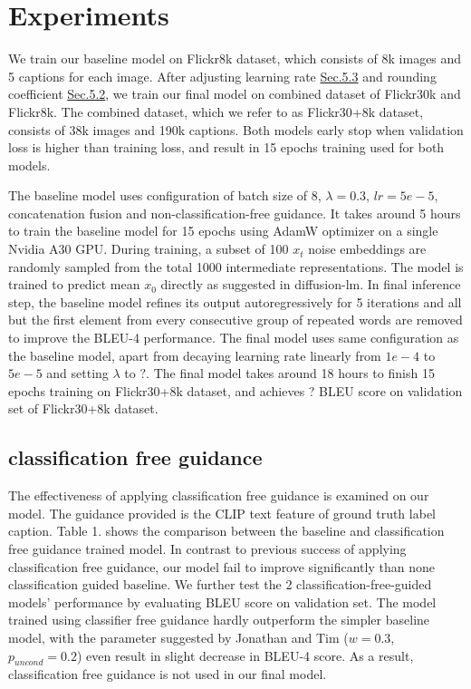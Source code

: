 \documentclass{article}
\begin{document}
\section{Experiments}
We train our baseline model on Flickr8k\cite{flickr8k} dataset, which consists of 8k images and 5 captions for each image. After adjusting learning rate \hyperref[sec:lr-exp]{Sec.5.3} and rounding coefficient \hyperref[sec:lambda-exp]{Sec.5.2}, we train our final model on combined dataset of Flickr30k\cite{flickr30k} and Flickr8k\cite{flickr8k}. The combined dataset, which we refer to as Flickr30+8k dataset, consists of 38k images and 190k captions. Both models early stop when validation loss is higher than training loss, and result in 15 epochs training used for both models.

The baseline model uses configuration of batch size of 8, $\lambda = 0.3$, $lr = 5e-5$, concatenation fusion and non-classification-free guidance. It takes around 5 hours to train the baseline model for 15 epochs using AdamW optimizer on a single Nvidia A30 GPU. During training, a subset of 100 $x_t$ noise embeddings are randomly sampled from the total 1000 intermediate representations. The model is trained to predict mean $x_0$ directly as suggested in diffusion-lm\cite{diffuselm}. In final inference step, the baseline model refines its output autoregressively for 5 iterations and all but the first element from every consecutive group of repeated words are removed to improve the BLEU-4 performance. The final model uses same configuration as the baseline model, apart from decaying learning rate linearly from $1e-4$ to $5e-5$ and setting $\lambda$ to $?$. The final model takes around 18 hours to finish 15 epochs training on Flickr30+8k dataset, and achieves ? BLEU score on validation set of Flickr30+8k dataset.

\subsection{classification free guidance}
\label{sec:classification-free-exp}
The effectiveness of applying classification free guidance is examined on our model. The guidance provided is the CLIP text feature of ground truth label caption. Table 1. shows the comparison between the baseline and classification free guidance trained model. In contrast to previous success of applying classification free guidance, our model fail to improve significantly than none classification guided baseline. We further test the 2 classification-free-guided models' performance by evaluating BLEU score on validation set. The model trained using classifier free guidance hardly outperform the simpler baseline model, with the parameter suggested by Jonathan and Tim \cite{classifier-free} ($w = 0.3$, $p_{uncond} = 0.2$) even result in slight decrease in BLEU-4 score. As a result, classification free guidance is not used in our final model.
\end{document}
